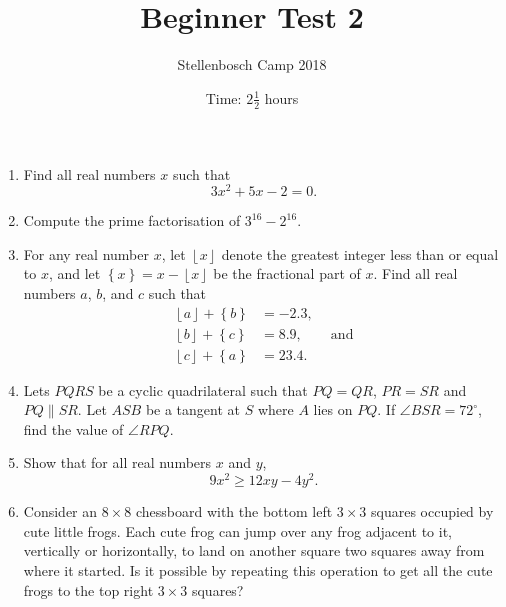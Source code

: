 \documentclass{article}
\title{Beginner Test 2}
\author{Stellenbosch Camp 2018}
\date{Time: $2\frac{1}{2}$ hours}
\newcommand{\floor}[1]{\ensuremath{\left\lfloor#1\right\rfloor}}
\newcommand{\fracpart}[1]{\ensuremath{\left\{#1\right\}}}
\begin{document}
\maketitle

\begin{enumerate}[1.]

\item %
Find all real numbers $x$ such that \[ 3x^2 +5x -2 = 0. \]


\vspace{6pt}
\item %
Compute the prime factorisation of $3^{16} -2^{16}$.


\vspace{12pt}
\item %
For any real number $x$, let $\floor{x}$ denote the greatest integer less than or equal to $x$, and let $\fracpart{x} = x -\floor{x}$ be the fractional part of $x$. Find all real numbers $a$, $b$, and $c$ such that
\begin{align*}
  \floor{a} +\fracpart{b} &= -2.3, \\
  \floor{b} +\fracpart{c} &= 8.9, \qquad \mathrm{and}\\
  \floor{c} +\fracpart{a} &= 23.4.
\end{align*}


\vspace{6pt}
\item %
Lets $PQRS$ be a cyclic quadrilateral such that $PQ = QR$, $PR = SR$ and $PQ \parallel SR$. Let $ASB$ be a tangent at $S$ where $A$ lies on $PQ$. If $\angle BSR = 72^{\circ}$, find the value of $\angle RPQ$.


\vspace{12pt}
\item %
Show that for all real numbers $x$ and $y$, \[ 9x^2 \geq 12xy -4y^2. \]


\vspace{6pt}
\item %
Consider an $8 \times 8$ chessboard with the bottom left $3 \times 3$ squares occupied by cute little frogs. Each cute frog can jump over any frog adjacent to it, vertically or horizontally, to land on another square two squares away from where it started. Is it possible by repeating this operation to get all the cute frogs to the top right $3 \times 3$ squares?


\end{enumerate}


\vspace{12pt}
\begin{center}
\begin{BVerbatim}

\end{BVerbatim}
\end{center}
\end{document}

